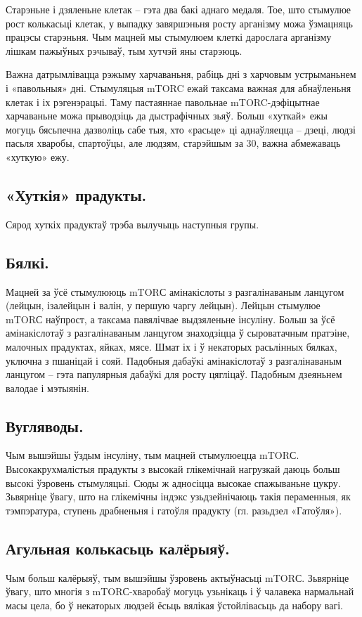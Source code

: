 Старэньне і дзяленьне клетак – гэта два бакі аднаго медаля. Тое, што стымулюе рост колькасьці клетак, у выпадку завяршэньня росту арганізму можа ўзмацняць працэсы старэньня. Чым мацней мы стымулюем клеткі дарослага арганізму лішкам пажыўных рэчываў, тым хутчэй яны старэюць.

Важна датрымлівацца рэжыму харчаваньня, рабіць дні з харчовым устрыманьнем і «павольныя» дні. Стымуляцыя mTORC ежай таксама важная для абнаўленьня клетак і іх рэгенэрацыі. Таму пастаяннае павольнае mTORC-дэфіцытнае харчаваньне можа прыводзіць да дыстрафічных зьяў. Больш «хуткай» ежы могуць бясьпечна дазволіць сабе тыя, хто «расьце» ці аднаўляецца – дзеці, людзі пасьля хваробы, спартоўцы, але людзям, старэйшым за 30, важна абмежаваць «хуткую» ежу.

\subsection{«Хуткія» прадукты.}
Сярод хуткіх прадуктаў трэба вылучыць наступныя групы.

\subsection{Бялкі.}
Мацней за ўсё стымулююць mTORС амінакіслоты з разгалінаваным ланцугом (лейцын, ізалейцын і валін, у першую чаргу лейцын). Лейцын стымулюе mTORС наўпрост, а таксама павялічвае выдзяленьне інсуліну. Больш за ўсё амінакіслотаў з разгалінаваным ланцугом знаходзіцца ў сыроватачным пратэіне, малочных прадуктах, яйках, мясе. Шмат іх і ў некаторых расьлінных бялках, уключна з пшаніцай і сояй. Падобныя дабаўкі амінакіслотаў з разгалінаваным ланцугом – гэта папулярныя дабаўкі для росту цягліцаў. Падобным дзеяньнем валодае і мэтыянін.

\subsection{Вугляводы.}
Чым вышэйшы ўздым інсуліну, тым мацней стымулюецца mTORС. Высокакрухмалістыя прадукты з высокай глікемічнай нагрузкай даюць больш высокі ўзровень стымуляцыі. Сюды ж адносіцца высокае спажываньне цукру. Зьвярніце ўвагу, што на глікемічны індэкс узьдзейнічаюць такія пераменныя, як тэмпэратура, ступень драбненьня і гатоўля прадукту (гл. разьдзел «Гатоўля»).

\subsection{Агульная колькасьць калёрыяў.}
Чым больш калёрыяў, тым вышэйшы ўзровень актыўнасьці mTORС. Зьвярніце ўвагу, што многія з mTORС-хваробаў могуць узьнікаць і ў чалавека нармальнай масы цела, бо ў некаторых людзей ёсьць вялікая ўстойлівасьць да набору вагі.

